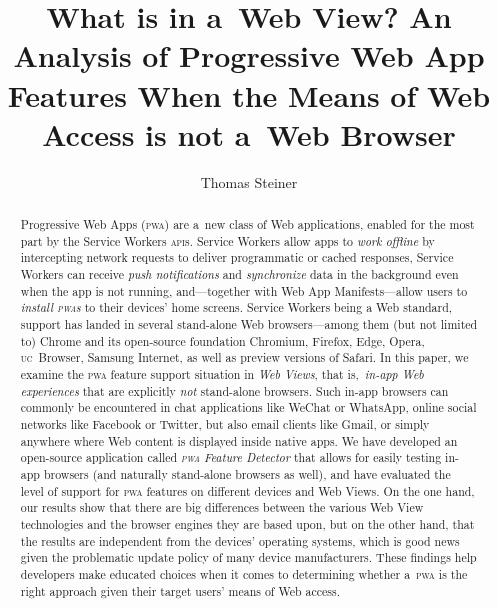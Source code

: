 \documentclass[sigconf]{acmart}
\begin{document}
\title[What is in a~Web View?]{What is in a~Web View?
An Analysis of Progressive Web App Features
When the Means of Web Access is not a~Web Browser}  



\author{Thomas Steiner}



\begin{abstract}
Progressive Web Apps (\textsc{pwa}) are a~new class of Web applications,
enabled for the most part by the Service Workers \textsc{api}s.
Service Workers allow apps to \emph{work offline}
by intercepting network requests to deliver programmatic or cached responses,
Service Workers can receive \emph{push notifications}
and \emph{synchronize} data in the background
even when the app is not running,
and---together with Web App Manifests---allow users to \emph{install \textsc{pwa}s}
to their devices' home screens.
Service Workers being a Web standard, support has landed in several
stand-alone Web browsers---among them (but not limited to)
Chrome and its open-source foundation Chromium, Firefox, Edge, Opera,
\textsc{uc}~Browser, Samsung Internet, as well as preview versions of Safari.
In this paper, we examine the \textsc{pwa} feature support situation in \emph{Web Views},
that is,\ \emph{in-app Web experiences} that are explicitly \emph{not} stand-alone browsers.
Such in-app browsers can commonly be encountered in chat applications like WeChat or WhatsApp,
online social networks like Facebook or Twitter, but also email clients like Gmail,
or simply anywhere where Web content is displayed inside native apps.
We have developed an open-source application called \emph{\textsc{pwa} Feature Detector}
that allows for easily testing in-app browsers (and naturally stand-alone browsers as well),
and have evaluated the level of support for \textsc{pwa} features
on different devices and Web Views.
On the one hand, our results show that there are big differences
between the various Web View technologies
and the browser engines they are based upon,
but on the other hand, that the results
are independent from the devices' operating systems,
which is good news given the problematic update policy of many device manufacturers.
These findings help developers make educated choices when it comes to determining
whether a~\textsc{pwa} is the right approach given their target users' means of Web access.
\end{abstract}
\end{document}
